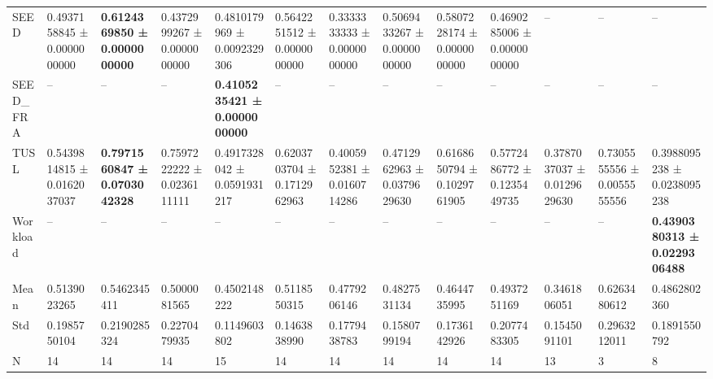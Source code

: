 \begin{table}[htbp]
\begin{tabular}{lllllllllllll}
SEED & 0.4937158845 ± 0.0000000000 & \bfseries 0.6124369850 ± 0.0000000000 & 0.4372999267 ± 0.0000000000 & 0.4810179969 ± 0.0092329306 & 0.5642251512 ± 0.0000000000 & 0.3333333333 ± 0.0000000000 & 0.5069433267 ± 0.0000000000 & 0.5807228174 ± 0.0000000000 & 0.4690285006 ± 0.0000000000 & -- & -- & -- \\
SEED_FRA & -- & -- & -- & \bfseries 0.4105235421 ± 0.0000000000 & -- & -- & -- & -- & -- & -- & -- & -- \\
TUSL & 0.5439814815 ± 0.0162037037 & \bfseries 0.7971560847 ± 0.0703042328 & 0.7597222222 ± 0.0236111111 & 0.4917328042 ± 0.0591931217 & 0.6203703704 ± 0.1712962963 & 0.4005952381 ± 0.0160714286 & 0.4712962963 ± 0.0379629630 & 0.6168650794 ± 0.1029761905 & 0.5772486772 ± 0.1235449735 & 0.3787037037 ± 0.0129629630 & 0.7305555556 ± 0.0055555556 & 0.3988095238 ± 0.0238095238 \\
Workload & -- & -- & -- & -- & -- & -- & -- & -- & -- & -- & -- & \bfseries 0.4390380313 ± 0.0229306488 \\
Mean & 0.5139023265 & 0.5462345411 & 0.5000081565 & 0.4502148222 & 0.5118550315 & 0.4779206146 & 0.4827531134 & 0.4644735995 & 0.4937251169 & 0.3461806051 & 0.6263480612 & 0.4862802360 \\
Std & 0.1985750104 & 0.2190285324 & 0.2270479935 & 0.1149603802 & 0.1463838990 & 0.1779438783 & 0.1580799194 & 0.1736142926 & 0.2077483305 & 0.1545091101 & 0.2963212011 & 0.1891550792 \\
N & 14 & 14 & 14 & 15 & 14 & 14 & 14 & 14 & 14 & 13 & 3 & 8 \\
\bottomrule
\end{tabular}
\end{table}
